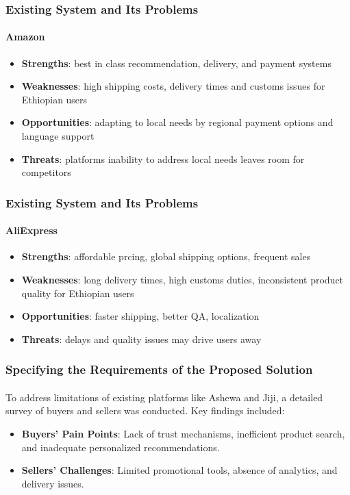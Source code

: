\documentclass{beamer}
\begin{document}
\begin{frame}
	\frametitle{Existing System and Its Problems}
	\framesubtitle{Amazon}
	\begin{itemize}
		\item \textbf{Strengths}: best in class recommendation, delivery, and
		      payment systems
		\item \textbf{Weaknesses}: high shipping costs, delivery times and
		      customs issues for Ethiopian users
		\item \textbf{Opportunities}: adapting to local needs by regional
		      payment options and language support
		\item \textbf{Threats}: platforms inability to address local needs
		      leaves room for competitors
	\end{itemize}
\end{frame}

\begin{frame}
	\frametitle{Existing System and Its Problems}
	\framesubtitle{AliExpress}
	\begin{itemize}
		\item \textbf{Strengths}: affordable prcing, global shipping options,
		      frequent sales
		\item \textbf{Weaknesses}: long delivery times, high customs duties,
		      inconsistent product quality for Ethiopian users
		\item \textbf{Opportunities}: faster shipping, better QA, localization
		\item \textbf{Threats}: delays and quality issues may drive users away
	\end{itemize}
\end{frame}

\begin{frame}
	\frametitle{Specifying the Requirements of the Proposed Solution}
	\framesubtitle{}
	To address limitations of existing platforms like Ashewa and Jiji, a detailed
	survey of buyers and sellers was conducted. Key findings included:
	\begin{itemize}
		\item \textbf{Buyers' Pain Points}: Lack of trust mechanisms, inefficient product search, and inadequate personalized recommendations.
		\item \textbf{Sellers' Challenges}: Limited promotional tools, absence of analytics, and delivery issues.
	\end{itemize}
\end{frame}
\end{document}
